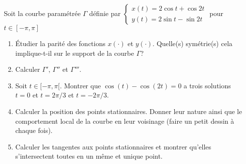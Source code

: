 \documentclass[a4paper]{tp_um}
\begin{document}
		
		
		
		
		
		
  Soit la courbe paramétrée $\Gamma$ définie par $\begin{cases}x(t)= 2\cos t + \cos 2t \\ y(t) = 2\sin t - \sin 2t \end{cases}$ pour $t\in[-\pi,\pi]$

	\begin{enumerate}
		\item \'Etudier la parité des fonctions $x(\cdot)$ et $y(\cdot)$. Quelle(s) symétrie(s) cela implique-t-il sur le support de la courbe $\Gamma$?
			\blanc{5cm}


		\item Calculer $\Gamma'$, $\Gamma''$ et $\Gamma'''$.
			\blanc{8cm}

\item Soit $t \in [-\pi,\pi[$. Montrer que $\cos(t) - \cos(2t) = 0$ a trois solutions $t = 0$ et $t=2\pi/3$ et $t= -2\pi/3$. 
	\blanc{7cm}

	\item Calculer la position des points stationnaires. Donner leur nature ainsi que le comportement local de la courbe en leur voisinage (faire un petit dessin à chaque fois).
			\blanc{19cm}
	
		\item Calculer les tangentes aux points stationnaires et montrer qu'elles s'intersectent toutes en un même et unique point.

			\blanc{7cm}
		

\end{enumerate}
\end{document}
